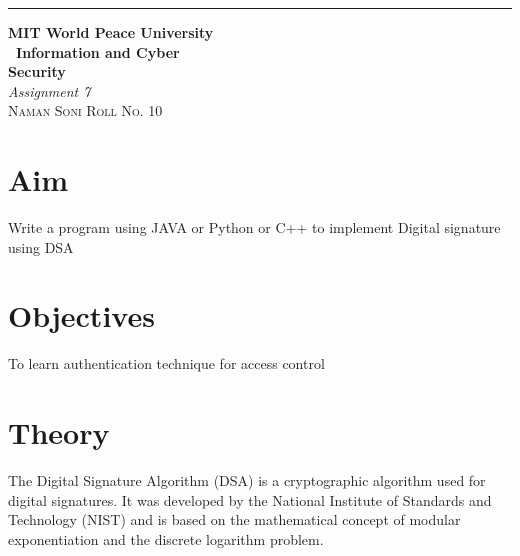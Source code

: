 \documentclass{article}
\begin{document}
	\begin{titlepage} %
	
	\raggedleft\rule{1pt}{\textheight} %
	\hspace{0.05\textwidth} %
	\parbox[b]{0.75\textwidth}
	{ %
		
		{\Huge\bfseries MIT World Peace University \\[0.5\baselineskip] \ Information and Cyber \\ Security}\\[2\baselineskip] %
		{\large\textit{Assignment 7}}\\[4\baselineskip] %
		{\Large\textsc{Naman Soni Roll No. 10}} %
		
		\vspace{0.5\textheight} %
	}
	
\end{titlepage}
\tableofcontents
\pagebreak
\section{\textbf{Aim}}
Write a program using JAVA or Python or C++ to implement Digital signature using DSA
\section{\textbf{Objectives}}
To learn authentication technique for access control
\section{\textbf{Theory}}
The Digital Signature Algorithm (DSA) is a cryptographic algorithm used for digital signatures. It was developed by the National Institute of Standards and Technology (NIST) and is based on the mathematical concept of modular exponentiation and the discrete logarithm problem.\\
\end{document}
